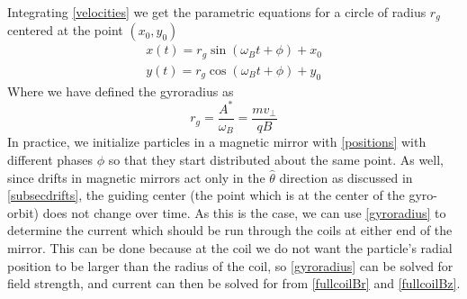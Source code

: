 \documentclass[12pt]{article}
\begin{document}
Integrating \eqref{velocities} we get the parametric equations for a circle of radius $r_g$ centered at the point $(x_0,y_0)$
\begin{equation}\label{positions}
\begin{split}
x(t)=r_g\sin(\omega_Bt+\phi)+x_0\\
y(t)=r_g\cos(\omega_Bt+\phi)+y_0
\end{split}
\end{equation}
Where we have defined the gyroradius as \cite{Stacey}
\begin{equation}\label{gyroradius}
r_g=\frac{A^*}{\omega_B}=\frac{mv_{\perp}}{qB}
\end{equation}
In practice, we initialize particles in a magnetic mirror with \eqref{positions} with different phases $\phi$ so that they start distributed about the same point. As well, since drifts in magnetic mirrors act only in the $\hat{\theta}$ direction as discussed in \ref{subsecdrifts}, the guiding center (the point which is at the center of the gyro-orbit) does not change over time. As this is the case, we can use \eqref{gyroradius} to determine the current which should be run through the coils at either end of the mirror. This can be done because at the coil we do not want the particle's radial position to be larger than the radius of the coil, so \eqref{gyroradius} can be solved for field strength, and current can then be solved for from \eqref{fullcoilBr} and \eqref{fullcoilBz}.
\end{document}
